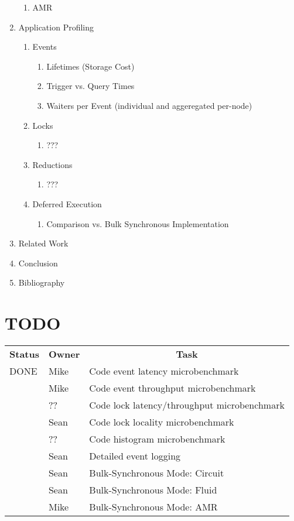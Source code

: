 \begin{enumerate}
\begin{enumerate}
  \item AMR
  \end{enumerate}
\item Application Profiling
  \begin{enumerate}
  \item Events
    \begin{enumerate}
    \item Lifetimes (Storage Cost)
    \item Trigger vs. Query Times
    \item Waiters per Event (individual and aggeregated per-node)
    \end{enumerate}
  \item Locks
    \begin{enumerate}
    \item ???
    \end{enumerate}
  \item Reductions
    \begin{enumerate}
    \item ???
    \end{enumerate}
  \item Deferred Execution
    \begin{enumerate}
    \item Comparison vs. Bulk Synchronous Implementation
    \end{enumerate}
  \end{enumerate}
\item Related Work
\item Conclusion
\item Bibliography
\end{enumerate}

\section{TODO}

\newcommand{\tblhdr}[1]{\multicolumn{1}{c}{\bf #1}}

\begin{tabular}{lll}
\tblhdr{Status} & \tblhdr{Owner} & \tblhdr{Task} \\
DONE & Mike & Code event latency microbenchmark \\
& Mike & Code event throughput microbenchmark \\
& ?? & Code lock latency/throughput microbenchmark \\
& Sean & Code lock locality microbenchmark \\
& ?? & Code histogram microbenchmark \\
& Sean & Detailed event logging \\
& Sean & Bulk-Synchronous Mode: Circuit \\
& Sean & Bulk-Synchronous Mode: Fluid \\
& Mike & Bulk-Synchronous Mode: AMR \\
\end{tabular}

